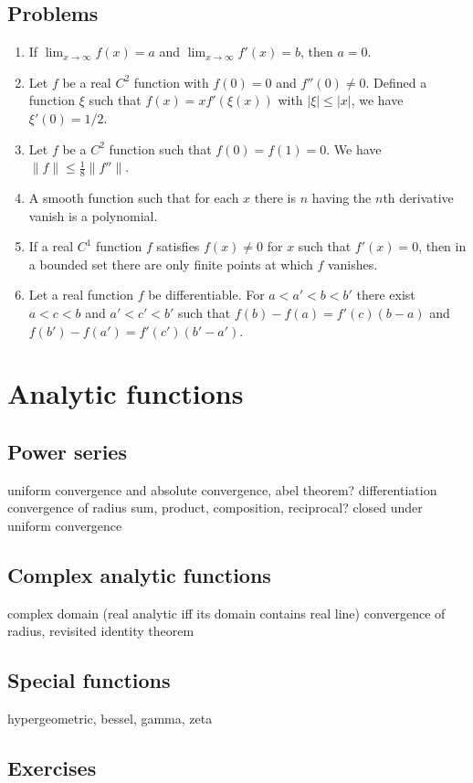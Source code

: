 \documentclass{../note}
\begin{document}
\section*{Problems}
\begin{enumerate}
\item If $\lim_{x\to\infty}f(x)=a$ and $\lim_{x\to\infty}f'(x)=b$, then $a=0$.
\item Let $f$ be a real $C^2$ function with $f(0)=0$ and $f''(0)\ne0$.
Defined a function $\xi$ such that $f(x)=xf'(\xi(x))$ with $|\xi|\le|x|$, we have $\xi'(0)=1/2$.
\item Let $f$ be a $C^2$ function such that $f(0)=f(1)=0$.
We have $\|f\|\le\frac18\|f''\|$.
\item A smooth function such that for each $x$ there is $n$ having the $n$th derivative vanish is a polynomial.
\item If a real $C^1$ function $f$ satisfies $f(x)\ne0$ for $x$ such that $f'(x)=0$, then in a bounded set there are only finite points at which $f$ vanishes.
\item Let a real function $f$ be differentiable.
For $a<a'<b<b'$ there exist $a<c<b$ and $a'<c'<b'$ such that $f(b)-f(a)=f'(c)(b-a)$ and $f(b')-f(a')=f'(c')(b'-a')$.

\end{enumerate}


\chapter{Analytic functions}
\section{Power series}
uniform convergence and absolute convergence, abel theorem?
differentiation
convergence of radius
sum, product, composition, reciprocal?
closed under uniform convergence
\section{Complex analytic functions}
complex domain
(real analytic iff its domain contains real line)
convergence of radius, revisited
identity theorem
\section{Special functions}
hypergeometric, bessel, gamma, zeta

\section*{Exercises}
\end{document}
